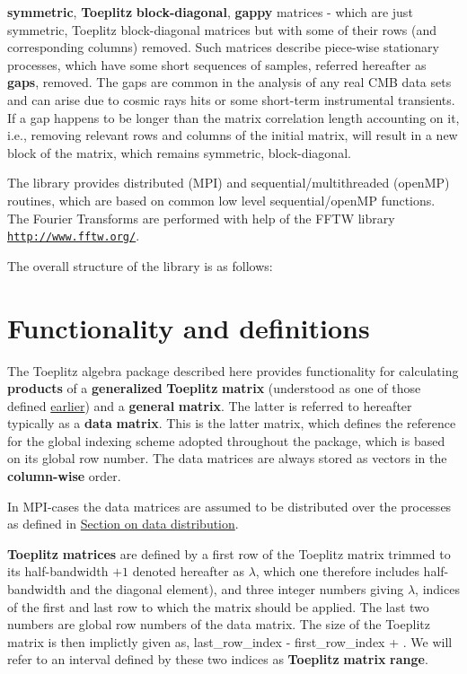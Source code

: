 \begin{DoxyItemize}
\item {\bfseries symmetric}, {\bfseries Toeplitz} {\bfseries block-\/diagonal}, {\bfseries gappy} matrices -\/ which are just symmetric, Toeplitz block-\/diagonal matrices but with some of their rows (and corresponding columns) removed. Such matrices describe piece-\/wise stationary processes, which have some short sequences of samples, referred hereafter as {\bfseries gaps}, removed. The gaps are common in the analysis of any real C\-M\-B data sets and can arise due to cosmic rays hits or some short-\/term instrumental transients. If a gap happens to be longer than the matrix correlation length accounting on it, i.\-e., removing relevant rows and columns of the initial matrix, will result in a new block of the matrix, which remains symmetric, block-\/diagonal.
\end{DoxyItemize}

The library provides distributed (M\-P\-I) and sequential/multithreaded (open\-M\-P) routines, which are based on common low level sequential/open\-M\-P functions. The Fourier Transforms are performed with help of the F\-F\-T\-W library \href{http://www.fftw.org/}{\tt http\-://www.\-fftw.\-org/}.

The overall structure of the library is as follows\-:

\hypertarget{toeplitz_functionality}{}\section{Functionality and definitions}\label{toeplitz_functionality}
The Toeplitz algebra package described here provides functionality for calculating {\bfseries products} of a {\bfseries generalized} {\bfseries Toeplitz} {\bfseries matrix} (understood as one of those defined \hyperlink{toeplitz_intro}{earlier}) and a {\bfseries general} {\bfseries matrix}. The latter is referred to hereafter typically as a {\bfseries data} {\bfseries matrix}. This is the latter matrix, which defines the reference for the global indexing scheme adopted throughout the package, which is based on its global row number. The data matrices are always stored as vectors in the {\bfseries column-\/wise} order.

In M\-P\-I-\/cases the data matrices are assumed to be distributed over the processes as defined in \hyperlink{toeplitz_datadistr}{Section on data distribution}.

{\bfseries Toeplitz} {\bfseries matrices} are defined by a first row of the Toeplitz matrix trimmed to its half-\/bandwidth $+1$ denoted hereafter as $\lambda$, which one therefore includes half-\/bandwidth and the diagonal element), and three integer numbers giving $\lambda$, indices of the first and last row to which the matrix should be applied. The last two numbers are global row numbers of the data matrix. The size of the Toeplitz matrix is then implictly given as, {\ttfamily last\-\_\-row\-\_\-index} -\/ {\ttfamily first\-\_\-row\-\_\-index} + {}. We will refer to an interval defined by these two indices as {\bfseries Toeplitz} {\bfseries matrix} {\bfseries range}.

